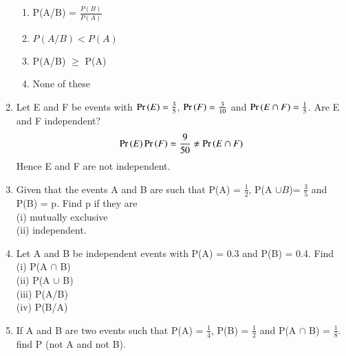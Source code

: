 \begin{enumerate}[label=\thesection.\arabic*.,ref=\thesection.\theenumi]
\begin{enumerate}
\item P(A/B) = $\frac{P(B)}{P(A)}$
\item $P(A/B) < P(A)$
\item P(A/B) $\geq$ P(A)
\item None of these
\end{enumerate}
\solution

\item Let E and F be events with $\Pr\left(E\right) = \frac{3}{5}$, $\Pr\left(F\right) = \frac{3}{10}$ and  $\Pr\left(E \cap F\right) = \frac{1}{5}$. Are E and F independent?
\\
\solution 
\begin{align}
\Pr\left(E\right)\Pr\left(F\right) = \frac{9}{50} \ne \Pr\left(E \cap F\right)
\end{align}
%
Hence E and F are not independent.
\item Given that the events A and B are such that P(A) = $\frac{1}{2}$, P(A $\cup B$)= $\frac{3}{5}$ and P(B) = p. Find p if they are\\
(i) mutually exclusive\\
(ii) independent.\\
\solution

\item Let A and B be independent events with P(A) = 0.3 and P(B) = 0.4. Find\\
(i) P(A $\cap$ B)\\ 
(ii) P(A $\cup$ B)\\
(iii) P(A/B)\\
(iv) P(B/A)\\
\solution

\item If A and B are two events such that P(A) = $\frac{1}{4}$, P(B) = $\frac{1}{2}$ and P(A $\cap$ B) = $\frac{1}{8}$. find P (not A and not B).\\
\solution



\end{enumerate}
